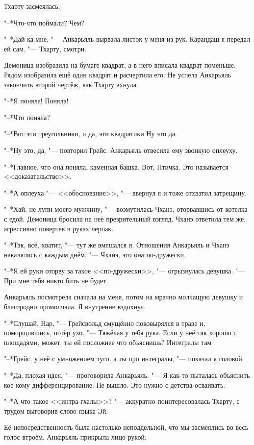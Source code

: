 \documentclass[a4paper,10pt]{book}
\newcommand{\ldotst}{\so{...}\xspace}
\newcommand{\ldotse}{\so{!..}\xspace}
\begin{document}
Тхарту засмеялась:

"--*Что-что поймали? Чем?

"--*Дай-ка мне, "--- Анкарьяль вырвала листок у меня из рук. Карандаш я передал 
ей сам. "--- Тхарту, смотри.

Демоница изобразила на бумаге квадрат, а в него вписала квадрат поменьше. Рядом 
изобразила ещё один квадрат и расчертила его. Не успела Анкарьяль закончить 
второй чертёж, как Тхарту ахнула:

"--*Я поняла! Поняла!

"--*Что поняла?

"--*Вот эти треугольники, и да, эти квадратики\ldotse Ну это\ldotst да.

"--*Ну это, да, "--- повторил Грейс. Анкарьяль отвесила ему звонкую оплеуху.

"--*Главное, что она поняла, каменная башка. Вот, Птичка. Это называется 
<<доказательство>>.

"--*А оплеуха "--- <<обоснование>>, "--- ввернул я и тоже отхватил затрещину.

"--*Хай, не лупи моего мужчину, "--- возмутилась Чханэ, оторвавшись от котелка 
с 
едой. Демоница бросила на неё презрительный взгляд. Чханэ ответила тем же, 
агрессивно повертев в руках черпак.

"--*Так, всё, хватит, "--- тут же вмешался я. Отношения Анкарьяль и Чханэ 
накалялись с каждым днём. "--- Чханэ, это она по-дружески.

"--*Я ей руки оторву за такое <<по-дружески>>, "--- огрызнулась девушка. "--- 
При 
мне тебя никто бить не будет.

Анкарьяль посмотрела сначала на меня, потом на мрачно молчащую девушку\ldotst и 
благородно промолчала. Я внутренне вздохнул.

"--*Слушай, Нар, "--- Грейсвольд смущённо поковырялся в траве и, поморщившись, 
потёр ухо. "--- Тяжёлая у тебя рука. Если у неё так хорошо с площадями, может, 
ты ей посложнее что объяснишь? Интегралы там\ldotst

"--*Грейс, у неё с умножением туго, а ты про интегралы, "--- покачал я головой.

"--*Да, плохая идея, "--- проговорила Анкарьяль. "--- Я как-то пыталась 
объяснить 
кое-кому дифференцирование. Не вышло. Это нужно с детства осваивать.

"--*А что такое <<интра-гхалы>>? "--- аккуратно поинтересовалась Тхарту, с 
трудом выговорив слово языка Эй.

Её непосредственность была настолько неподдельной, что мы засмеялись во весь 
голос втроём. Анкарьяль прикрыла лицо рукой:
\end{document}
